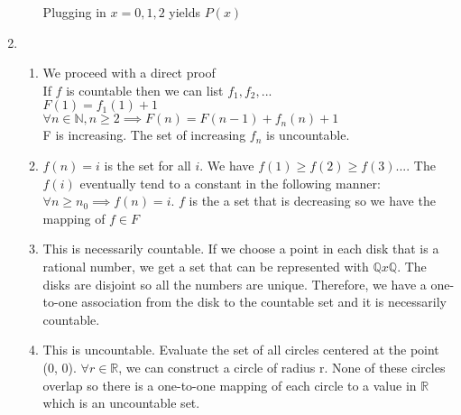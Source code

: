 \documentclass[a4paper]{article}
\newcommand{\R}{\mathbb{R}}
\newcommand{\N}{\mathbb{N}}
\newcommand{\Q}{\mathbb{Q}}
\newcommand{\<}{\langle}
\renewcommand{\>}{\rangle}
\renewcommand{\^}{\wedge}
\begin{document}
\begin{enumerate}
\begin{enumerate}
            Plugging in $x = 0,1,2$ yields $P(x)$
        \end{enumerate}
    \item
        \begin{enumerate}
            \item We proceed with a direct proof\\
            If $f$ is countable then we can list $f_1,f_2,...$\\
            $F(1) = f_1(1) + 1$\\
            $\forall n \in \N, n \geq 2 \implies F(n) = F(n-1) + f_n(n) + 1$\\
            F is increasing. The set of increasing $f_n$ is uncountable.
            \item $f(n) = i$ is the set for all $i$. We have $f(1) \geq f(2) \geq f(3) ... $. The $f(i)$ eventually tend to a constant in the following manner: $\forall n \geq n_0 \implies f(n) = i$. $f$ is the a set that is decreasing so we have the mapping of $f \in F$
            \item  This is necessarily countable. If we choose a point in each disk that is a rational number, we get a set that can be represented with $\Q x \Q$. The disks are disjoint so all the numbers are unique. Therefore, we have a one-to-one association from the disk to the countable set and it is necessarily countable.
            \item This is uncountable. Evaluate the set of all circles centered at the point (0, 0). $\forall r \in \R$, we can construct a circle of radius r. None of these circles overlap so there is a one-to-one mapping of each circle to a value in $\R$ which is an uncountable set.
        \end{enumerate}
\end{enumerate}
\end{document}
